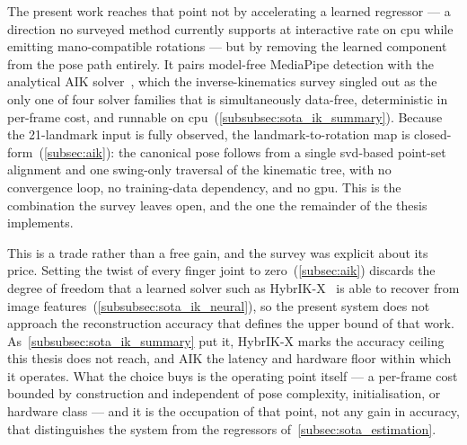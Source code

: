The present work reaches that point not by accelerating a learned regressor ---
a direction no surveyed method currently supports at interactive rate on
\acrshort{cpu} while emitting \acrshort{mano}-compatible rotations --- but by
removing the learned component from the pose path entirely.
It pairs model-free MediaPipe detection with the analytical AIK
solver~\cite{meng2021aik}, which the inverse-kinematics survey singled out as the
only one of four solver families that is simultaneously data-free, deterministic
in per-frame cost, and runnable on
\acrshort{cpu}~(\autoref{subsubsec:sota_ik_summary}).
Because the 21-landmark input is fully observed, the landmark-to-rotation map is
closed-form~(\autoref{subsec:aik}): the canonical pose follows from a single
\acrshort{svd}-based point-set alignment and one swing-only traversal of the
kinematic tree, with no convergence loop, no training-data dependency, and no
\acrshort{gpu}.
This is the combination the survey leaves open, and the one the remainder of the
thesis implements.

This is a trade rather than a free gain, and the survey was explicit about its
price.
Setting the twist of every finger joint to zero~(\autoref{subsec:aik}) discards
the degree of freedom that a learned solver such as
HybrIK-X~\cite{li2023hybrikx} is able to recover from image
features~(\autoref{subsubsec:sota_ik_neural}), so the present system does not
approach the reconstruction accuracy that defines the upper bound of that work.
As~\autoref{subsubsec:sota_ik_summary} put it, HybrIK-X marks the accuracy
ceiling this thesis does not reach, and AIK the latency and hardware floor within
which it operates.
What the choice buys is the operating point itself --- a per-frame cost bounded
by construction and independent of pose complexity, initialisation, or hardware
class --- and it is the occupation of that point, not any gain in accuracy, that
distinguishes the system from the regressors
of~\autoref{subsec:sota_estimation}.

